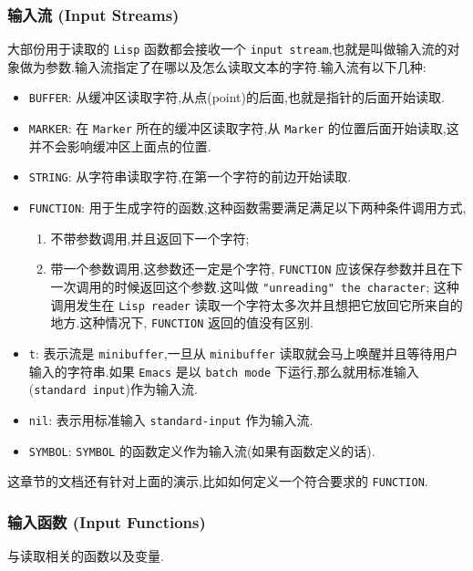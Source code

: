 \documentclass[11pt]{article}
\begin{document}
\subsubsection{输入流 (Input Streams)}
\label{sec:org8a69e84}

大部份用于读取的 \texttt{Lisp} 函数都会接收一个 \texttt{input stream},也就是叫做输入流的对象做为参数.输入流指定了在哪以及怎么读取文本的字符.输入流有以下几种:

\begin{itemize}
\item \texttt{BUFFER}: 从缓冲区读取字符,从点(point)的后面,也就是指针的后面开始读取.
\item \texttt{MARKER}: 在 \texttt{Marker} 所在的缓冲区读取字符,从 \texttt{Marker} 的位置后面开始读取,这并不会影响缓冲区上面点的位置.
\item \texttt{STRING}: 从字符串读取字符,在第一个字符的前边开始读取.
\item \texttt{FUNCTION}: 用于生成字符的函数,这种函数需要满足满足以下两种条件调用方式,
\begin{enumerate}
\item 不带参数调用,并且返回下一个字符;
\item 带一个参数调用,这参数还一定是个字符, \texttt{FUNCTION} 应该保存参数并且在下一次调用的时候返回这个参数.这叫做 \texttt{"unreading" the character};
这种调用发生在 \texttt{Lisp reader} 读取一个字符太多次并且想把它放回它所来自的地方.这种情况下, \texttt{FUNCTION} 返回的值没有区别.
\end{enumerate}
\item \texttt{t}: 表示流是 \texttt{minibuffer},一旦从 \texttt{minibuffer} 读取就会马上唤醒并且等待用户输入的字符串.如果 \texttt{Emacs} 是以 \texttt{batch mode} 下运行,那么就用标准输入(\texttt{standard input})作为输入流.
\item \texttt{nil}: 表示用标准输入 \texttt{standard-input} 作为输入流.
\item \texttt{SYMBOL}: \texttt{SYMBOL} 的函数定义作为输入流(如果有函数定义的话).
\end{itemize}

这章节的文档还有针对上面的演示,比如如何定义一个符合要求的 \texttt{FUNCTION}.


\subsubsection{输入函数 (Input Functions)}
\label{sec:orgdcba4bf}

与读取相关的函数以及变量.
\end{document}
